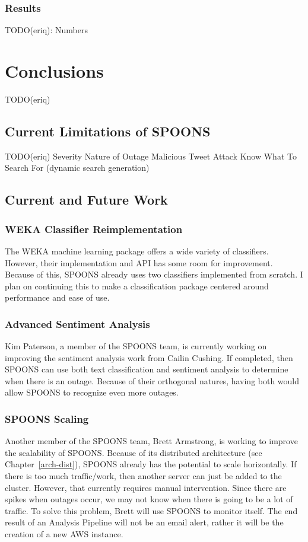 \documentclass[12pt]{ucthesis}
\begin{document}
\section{Results}
\label{outage-detection-results}
TODO(eriq): Numbers

\part{Conclusions}
\label{conclusions}
TODO(eriq)

\chapter{Current Limitations of SPOONS}
\label{limitations}
TODO(eriq)
Severity
Nature of Outage
Malicious Tweet Attack
Know What To Search For (dynamic search generation)

\chapter{Current and Future Work}
\label{future-work}

\section{WEKA Classifier Reimplementation}
\label{future-work-weka}
The WEKA machine learning package offers a wide variety of classifiers.
However, their implementation and API has some room for improvement.
Because of this, SPOONS already uses two classifiers implemented from scratch.
I plan on continuing this to make a classification package centered around performance
and ease of use.

\section{Advanced Sentiment Analysis}
\label{future-work-kim}
Kim Paterson, a member of the SPOONS team, is currently working on improving the sentiment
analysis work from Cailin Cushing\cite{cailinThesis}. If completed, then SPOONS can use
both text classification and sentiment analysis to determine when there is an outage.
Because of their orthogonal natures, having both would allow SPOONS to recognize even more outages.

\section{SPOONS Scaling}
\label{future-work-brett}
Another member of the SPOONS team, Brett Armstrong, is working to improve the scalability of SPOONS.
Because of its distributed architecture (see Chapter~\ref{arch-dist}), SPOONS already has the potential to
scale horizontally. If there is too much traffic/work, then another server can just be added to the cluster.
However, that currently requires manual intervention. Since there are spikes when outages occur, we may not know
when there is going to be a lot of traffic. To solve this problem, Brett will use SPOONS to monitor itself.
The end result of an Analysis Pipeline will not be an email alert, rather it will be the creation of a new
AWS instance.
\end{document}
